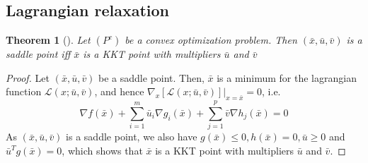 \documentclass{book}
\theoremstyle{theoremv2}
\newtheorem{theorem}{Theorem}[chapter]
\theoremstyle{defv2}
\theoremstyle{remark}
\theoremstyle{remark}
\begin{document}
\subsection{Lagrangian relaxation}
\begin{theorem}[]
    \label{lagrelax}
    Let $(P^c)$ be a convex optimization problem. Then $(\bar{x},\bar{u},\bar{v})$ is a saddle point iff $\bar{x}$ is a KKT point with multipliers $\bar{u}$ and $\bar{v}$
\end{theorem}
\begin{proof}
    Let $(\bar{x},\bar{u},\bar{v})$ be a saddle point. Then, $\bar{x}$ is a minimum for the lagrangian function $\mathcal{L}(x;\bar{u},\bar{v})$, and hence $\nabla_x [\mathcal{L}(x;\bar{u},\bar{v})]|_{x=\bar{x}}=0$, i.e.
    \[
        \nabla f(\bar{x})  + \displaystyle\sum_{i=1}^{m}\bar{u}_i\nabla g_i(\bar{x}) + \displaystyle\sum_{j=1}^{p}\bar{v}\nabla h_j(\bar{x})=0
    \]
    As $(\bar{x},\bar{u},\bar{v})$ is a saddle point, we also have $g(\bar{x})\leq0, h(\bar{x})=0,\bar{u}\geq 0$ and $\bar{u}^T g(\bar{x})=0$, which shows that $\bar{x}$ is a KKT point with multipliers $\bar{u}$ and $\bar{v}$. 


\end{proof}
\end{document}
